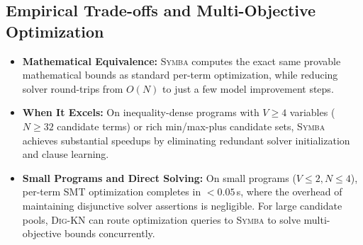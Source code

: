 \documentclass[runningheads]{llncs}
\newcommand{\tool}{\textsc{Dig-KN}\xspace}
\begin{document}
\subsection{Empirical Trade-offs and Multi-Objective Optimization}
\begin{itemize}[leftmargin=1.5em]
\item \textbf{Mathematical Equivalence:} \textsc{Symba} computes the exact same provable mathematical bounds as standard per-term optimization, while reducing solver round-trips from $O(N)$ to just a few model improvement steps.
\item \textbf{When It Excels:} On inequality-dense programs with $V \ge 4$ variables ($N \ge 32$ candidate terms) or rich min/max-plus candidate sets, \textsc{Symba} achieves substantial speedups by eliminating redundant solver initialization and clause learning.
\item \textbf{Small Programs and Direct Solving:} On small programs ($V \le 2, N \le 4$), per-term SMT optimization completes in $<0.05$\,s, where the overhead of maintaining disjunctive solver assertions is negligible. For large candidate pools, \tool{} can route optimization queries to \textsc{Symba} to solve multi-objective bounds concurrently.
\end{itemize}
\end{document}
